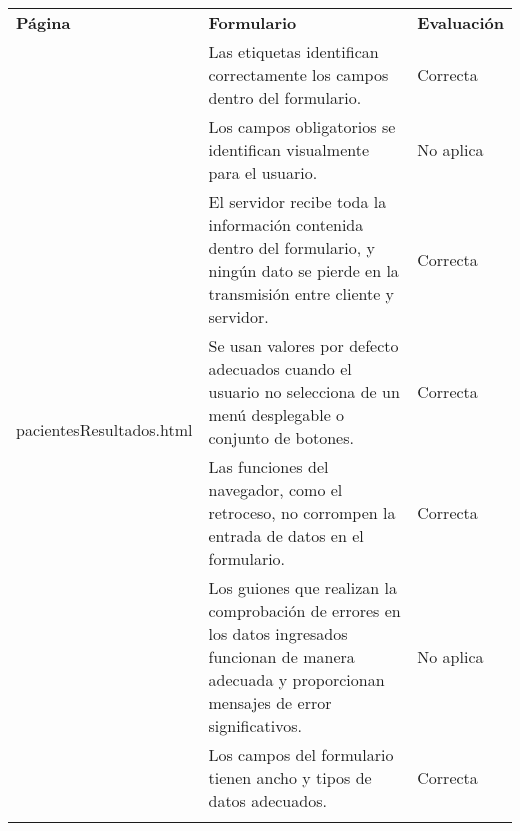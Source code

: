 \begin{table}[htpb]
\centering
\begin{tabularx}{\textwidth}{|l|X|l|}
\hline
\rowcolor[gray]{0.9}\multicolumn{3}{|l|}{\textbf{Anexo PI-002}}                                                                                                                                                                                   \\ \hline
\textbf{Página}                            & \textbf{Formulario}                                                                                                                                       & \textbf{Evaluación} \\ \hline
\multirow{10}{*}{pacientesResultados.html} & Las etiquetas identifican correctamente los campos dentro del formulario.                                                                                 & Correcta            \\ \cline{2-3} 
                                           & Los campos obligatorios se identifican visualmente para el usuario.                                                                                       & No aplica           \\ \cline{2-3} 
                                           & El servidor recibe toda la información contenida dentro del formulario, y ningún dato se pierde en la transmisión entre cliente y servidor.               & Correcta            \\ \cline{2-3} 
                                           & Se usan valores por defecto adecuados cuando el usuario no selecciona de un menú desplegable o conjunto de botones.                                       & Correcta            \\ \cline{2-3} 
                                           & Las funciones del navegador, como el retroceso, no corrompen la entrada de datos en el formulario.                                                        & Correcta            \\ \cline{2-3} 
                                           & Los guiones que realizan la comprobación de errores en los datos ingresados funcionan de manera adecuada y proporcionan mensajes de error significativos. & No aplica           \\ \cline{2-3} 
                                           & Los campos del formulario tienen ancho y tipos de datos adecuados.                                                                                        & Correcta            \\ \cline{2-3} 

\end{tabularx}
\end{table}
